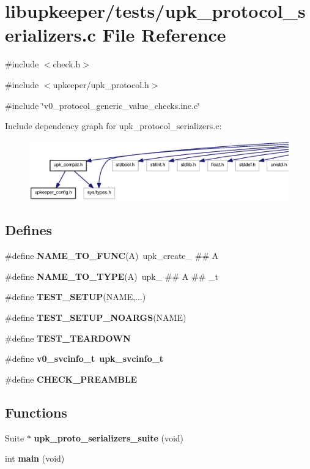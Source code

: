\section{libupkeeper/tests/upk\_\-protocol\_\-serializers.c File Reference}
\label{upk__protocol__serializers_8c}
{\ttfamily \#include $<$check.h$>$}\par
{\ttfamily \#include $<$upkeeper/upk\_\-protocol.h$>$}\par
{\ttfamily \#include \char`\"{}v0\_\-protocol\_\-generic\_\-value\_\-checks.inc.c\char`\"{}}\par
Include dependency graph for upk\_\-protocol\_\-serializers.c:\nopagebreak
\begin{figure}[H]
\begin{center}
\leavevmode
\includegraphics[width=400pt]{upk__protocol__serializers_8c__incl}
\end{center}
\end{figure}
\subsection*{Defines}
\begin{DoxyCompactItemize}
\item 
\#define {\bf NAME\_\-TO\_\-FUNC}(A)~upk\_\-create\_\- \#\# A
\item 
\#define {\bf NAME\_\-TO\_\-TYPE}(A)~upk\_\- \#\# A \#\# \_\-t
\item 
\#define {\bf TEST\_\-SETUP}(NAME,...)
\item 
\#define {\bf TEST\_\-SETUP\_\-NOARGS}(NAME)
\item 
\#define {\bf TEST\_\-TEARDOWN}
\item 
\#define {\bf v0\_\-svcinfo\_\-t}~{\bf upk\_\-svcinfo\_\-t}
\item 
\#define {\bf CHECK\_\-PREAMBLE}
\end{DoxyCompactItemize}
\subsection*{Functions}
\begin{DoxyCompactItemize}
\item 
Suite $\ast$ {\bf upk\_\-proto\_\-serializers\_\-suite} (void)
\item 
int {\bf main} (void)
\end{DoxyCompactItemize}


